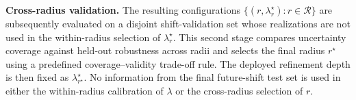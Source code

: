 \textbf{Cross-radius validation.}
The resulting configurations
$\{(r,\lambda_r^\star):r\in\mathcal{R}\}$
are subsequently evaluated on a disjoint shift-validation set whose
realizations are not used in the within-radius selection of
$\lambda_r^\star$. This second stage compares uncertainty coverage against
held-out robustness across radii and selects the final radius
$r^\star$ using a predefined coverage--validity trade-off rule. The deployed
refinement depth is then fixed as
$\lambda_{r^\star}^\star$.
No information from the final future-shift test set is used in either the
within-radius calibration of $\lambda$ or the cross-radius selection of $r$.



